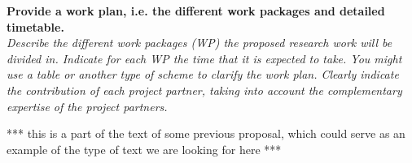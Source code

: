 \documentclass[11pt,dvipsnames,usenames,a4paper]{article}
\begin{document}
%

\vspace{7pt}

\textbf{Provide a work plan, i.e. the different work packages and detailed timetable.}\\
\textit{Describe the different work packages (WP) the proposed research work will be divided in.
Indicate for each WP the time that it is expected to take.
You might use a table or another type of scheme to clarify the work plan. Clearly indicate the contribution of each project partner, taking into account the complementary expertise of the project partners.}


*** this is a part of the text of some previous proposal, which could serve as an example of the type of text we are looking for here ***
\end{document}
